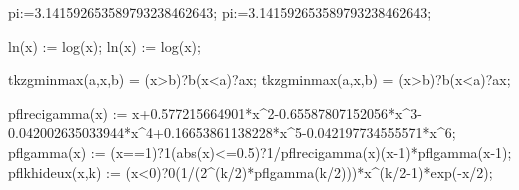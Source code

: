 
\newcommand\tkzgrphSetKVboolFalse[3][]{%
  \ifboolKV[#1]{#2}{\setKV[#1]{#3=true}}{}%
}

\newcommand\tkzgrphSetKVboolTrue[3][]{%
  \ifboolKV[#1]{#2}{}{\setKV[#1]{#3=false}}%
}

\xintdefvar pi:=3.141592653589793238462643;
\xintdeffloatvar pi:=3.141592653589793238462643;

\xintdeffunc ln(x) := log(x);
\xintdeffloatfunc ln(x) := log(x);

\xintdeffloatfunc tkzgminmax(a,x,b) = (x>b)?{b}{(x<a)?{a}{x}};
\xintdeffunc tkzgminmax(a,x,b) = (x>b)?{b}{(x<a)?{a}{x}};

\xintdeffloatfunc pflrecigamma(x) := x+0.577215664901*x^2-0.65587807152056*x^3-0.042002635033944*x^4+0.16653861138228*x^5-0.042197734555571*x^6;
\xintdeffloatfunc pflgamma(x) := (x==1)?{1}{(abs(x)<=0.5)?{1/pflrecigamma(x)}{(x-1)*pflgamma(x-1)}};
\xintdeffloatfunc pflkhideux(x,k) := (x<0)?{0}{(1/(2^(k/2)*pflgamma(k/2)))*x^(k/2-1)*exp(-x/2)};

\NewDocumentCommand{}

\NewDocumentCommand{}

\NewDocumentCommand{}

\NewDocumentCommand{}

